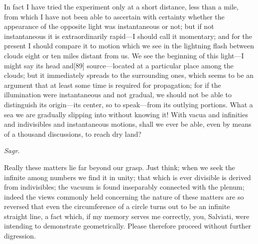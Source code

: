 \documentclass{article}
\begin{document}
In fact I have tried the experiment only at a short distance, less than a mile, from which I have not been able to ascertain with certainty whether the appearance of the opposite light was instantaneous or not; but if not instantaneous it is extraordinarily rapid---I should call it momentary; and for the present I should compare it to motion which we see in the lightning flash between clouds eight or ten miles distant from us. We see the beginning of this light---I might say its head and[89] source---located at a particular place among the clouds; but it immediately spreads to the surrounding ones, which seems to be an argument that at least some time is required for propagation; for if the illumination were instantaneous and not gradual, we should not be able to distinguish its origin---its center, so to speak---from its outlying portions. What a sea we are gradually slipping into without knowing it! With vacua and infinities and indivisibles and instantaneous motions, shall we ever be able, even by means of a thousand discussions, to reach dry land?

{\em Sagr.}

Really these matters lie far beyond our grasp. Just think; when we seek the infinite among numbers we find it in unity; that which is ever divisible is derived from indivisibles; the vacuum is found inseparably connected with the plenum; indeed the views commonly held concerning the nature of these matters are so reversed that even the circumference of a circle turns out to be an infinite straight line, a fact which, if my memory serves me correctly, you, Salviati, were intending to demonstrate geometrically. Please therefore proceed without further digression.
\end{document}
